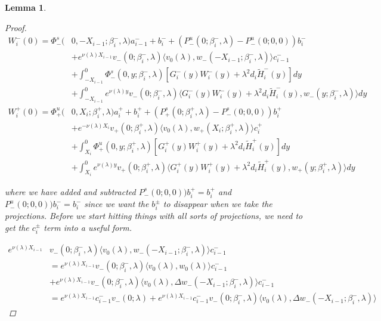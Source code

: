 \documentclass[12pt]{article}
\newtheorem{lemma}{Lemma}
\begin{document}
\begin{lemma}
\begin{proof}
\begin{align*}
W_i^-(0) = \Phi^s_-(&0, -X_{i-1}; \beta_i^-, \lambda)a_{i-1}^- + b_i^- + (P^u_-(0; \beta_i^-, \lambda) - P^u_-(0; 0, 0))b_i^- \\
&+ e^{\nu(\lambda)X_{i-1}} v_-(0; \beta_i^-, \lambda) \langle v_0(\lambda), w_-(-X_{i-1}; \beta_i^-, \lambda) \rangle c_{i-1}^- \\
&+ \int_{-X_{i-1}}^0 \Phi^s_-(0, y; \beta_i^-, \lambda) [ G_i^-(y)W_i^-(y) + \lambda^2 d_i \tilde{H}_i^-(y) ] dy \\
&+ \int_{-X_{i-1}}^0
e^{\nu(\lambda)y} v_-(0; \beta_i^-, \lambda) \langle G_i^-(y)W_i^-(y) + \lambda^2 d_i \tilde{H}_i^-(y), w_-(y; \beta_i^-, \lambda) \rangle dy \\
W_i^+(0) = \Phi^u_+(&0, X_i; \beta_i^+, \lambda)a_i^+ + b_i^+ + (P^s_+(0; \beta_i^+, \lambda) - P^s_-(0; 0, 0))b_i^+ \\
&+ e^{-\nu(\lambda) X_i} v_+(0; \beta_i^+, \lambda) \langle v_0(\lambda), w_+(X_i; \beta_i^+, \lambda) \rangle c_i^+ \\
&+ \int_{X_i}^0 \Phi^u_+(0, y; \beta_i^+, \lambda) [ G_i^+(y)W_i^+(y) + \lambda^2 d_i \tilde{H}_i^+(y) ] dy \\
&+ \int_{X_i}^0 e^{\nu(\lambda)y} v_+(0; \beta_i^+, \lambda) \langle G_i^+(y)W_i^+(y) + \lambda^2 d_i \tilde{H}_i^+(y), w_+(y; \beta_i^+, \lambda) \rangle dy
\end{align*}

where we have added and subtracted $P^s_-(0; 0, 0))b_i^+ = b_i^+$ and $P^u_-(0; 0, 0))b_i^- = b_i^-$ since we want the $b_i^\pm$ to disappear when we take the projections. Before we start hitting things with all sorts of projections, we need to get the $c_i^\pm$ term into a useful form.

\begin{align*}
e^{\nu(\lambda)X_{i-1}} &v_-(0; \beta_i^-, \lambda) \langle v_0(\lambda), w_-(-X_{i-1}; \beta_i^-, \lambda) \rangle c_{i-1}^- \\
&= e^{\nu(\lambda)X_{i-1}} v_-(0; \beta_i^-, \lambda) \langle v_0(\lambda), w_0(\lambda) \rangle c_{i-1}^- \\
&+ e^{\nu(\lambda)X_{i-1}} v_-(0; \beta_i^-, \lambda) \langle v_0(\lambda), \Delta w_-(-X_{i-1}; \beta_i^-, \lambda) \rangle c_{i-1}^- \\
&= e^{\nu(\lambda)X_{i-1}} c_{i-1}^- v_-(0; \lambda) + e^{\nu(\lambda)X_{i-1}} c_{i-1}^- v_-(0; \beta_i^-, \lambda) \langle v_0(\lambda), \Delta w_-(-X_{i-1}; \beta_i^-, \lambda) \rangle 
\end{align*}


\end{proof}
\end{lemma}
\end{document}
